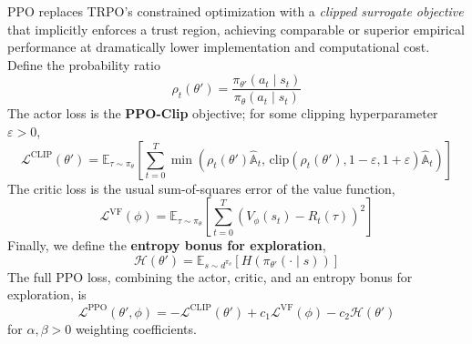 \documentclass[11pt, letterpaper]{article}
\begin{document}
\begin{concept}
    PPO replaces TRPO's constrained optimization with a \textit{clipped surrogate objective} that implicitly enforces a trust region, achieving comparable or superior empirical performance at dramatically lower implementation and computational cost. Define the probability ratio 
    \[
        \rho_t(\theta') = \frac{\pi_{\theta'}(a_t \mid s_t)}{\pi_\theta(a_t \mid s_t)}
    \]
    The actor loss is the \textbf{PPO-Clip} objective; for some clipping hyperparameter \(\varepsilon>0\), 
    \[
        \mathcal{L}^{\text{CLIP}}(\theta') = \mathbb{E}_{\tau \sim \pi_\theta} \left[ \sum_{t=0}^T \min\left( \rho_t(\theta') \widehat{\mathbb{A}}_t,\, \text{clip}(\rho_t(\theta'), 1-\varepsilon, 1+\varepsilon) \widehat{\mathbb{A}}_t \right) \right]
    \]
    The critic loss is the usual sum-of-squares error of the value function, 
    \[
        \mathcal{L}^{\text{VF}}(\phi) = \mathbb{E}_{\tau \sim \pi_\theta}\left[\sum_{t=0}^T (V_\phi(s_t) - R_t(\tau))^2\right]
    \]
    Finally, we define the \textbf{entropy bonus for exploration}, 
    \[
        \mathcal{H}(\theta') = \mathbb{E}_{s \sim d^{\pi_\theta}}[H(\pi_{\theta'}(\cdot \mid s))]
    \]
    The full PPO loss, combining the actor, critic, and an entropy bonus for exploration, is 
    \[
        \boxed{
            \mathcal{L}^{\text{PPO}}(\theta', \phi) 
            = -\mathcal{L}^{\text{CLIP}}(\theta') + c_1 \mathcal{L}^{\text{VF}}(\phi) - c_2 \mathcal{H}(\theta')
        }
    \]
    for \(\alpha, \beta > 0\) weighting coefficients. 
\end{concept}
\end{document}
